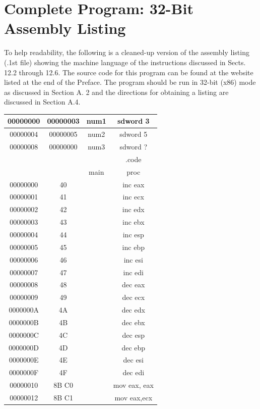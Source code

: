 \documentclass[10pt]{book}
\begin{document}
\section{Complete Program: 32-Bit Assembly Listing}
To help readability, the following is a cleaned-up version of the assembly listing (.1st file) showing the machine language of the instructions discussed in Sects. 12.2 through 12.6. The source code for this program can be found at the website listed at the end of the Preface. The program should be run in 32-bit (x86) mode as discussed in Section A. 2 and the directions for obtaining a listing are discussed in Section A.4.
\begin{center}
\begin{tabular}{|c|c|c|c|}
\hline
00000000 & 00000003 & num1 & sdword 3 \\
\hline
00000004 & 00000005 & num2 & sdword 5 \\
\hline
00000008 & 00000000 & num3 & sdword ? \\
\hline
 &  &  & .code \\
\hline
 &  & main & proc \\
\hline
00000000 & 40 &  & inc eax \\
\hline
00000001 & 41 &  & inc ecx \\
\hline
00000002 & 42 &  & inc edx \\
\hline
00000003 & 43 &  & inc ebx \\
\hline
00000004 & 44 &  & inc esp \\
\hline
00000005 & 45 &  & inc ebp \\
\hline
00000006 & 46 &  & inc esi \\
\hline
00000007 & 47 &  & inc edi \\
\hline
00000008 & 48 &  & dec eax \\
\hline
00000009 & 49 &  & dec ecx \\
\hline
0000000A & 4A &  & dec edx \\
\hline
0000000B & 4B &  & dec ebx \\
\hline
0000000C & 4C &  & dec esp \\
\hline
0000000D & 4D &  & dec ebp \\
\hline
0000000E & 4E &  & dec esi \\
\hline
0000000F & 4F &  & dec edi \\
\hline
00000010 & 8B C0 &  & mov eax, eax \\
\hline
00000012 & 8B C1 &  & mov eax,ecx \\

\end{tabular}
\end{center}
\end{document}
